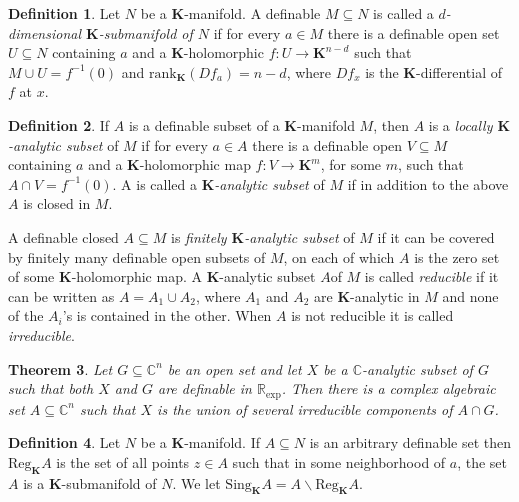 \documentclass{amsart}
\newtheorem{theorem}{Theorem}[subsection]
\theoremstyle{definition}
\newtheorem{definition}[theorem]{Definition}
\numberwithin{equation}{section}
\begin{document}
\begin{definition}
	Let $N$ be a $\mathbf{K}$-manifold.
	A definable $M \subseteq N$ is called a \emph{$d$-dimensional $\mathbf{K}$-submanifold of $N$} if for every $a\in M$ there is a definable open set $U \subseteq N$ containing $a$ and a $\mathbf{K}$-holomorphic $f: U \to \mathbf{K}^{n-d}$ such that $M \cup U = f^{-1}(0)$ and $\mathrm{rank}_{\mathbf{K}}(Df_a) = n-d$,
	where $Df_x$ is the $\mathbf{K}$-differential of $f$ at $x$.
\end{definition}

\begin{definition}
	If $A$ is a definable subset of a $\mathbf{K}$-manifold $M$,
	then $A$ is a \emph{locally $\mathbf{K}$-analytic subset} of $M$
	if for every $a\in A$ there is a definable open $V \subseteq M$ containing $a$ and a $\mathbf{K}$-holomorphic map $f : V \to \mathbf{K}^m$,
	for some $m$, such that $A\cap V= f^{-1}(0)$.
	A is called a \emph{$\mathbf{K}$-analytic subset} of $M$ if in addition to the above $A$ is closed in $M$.

	A definable closed $A \subseteq M$ is \emph{finitely $\mathbf{K}$-analytic subset} of $M$ if it can be covered by finitely many definable open subsets of $M$,
	on each of which $A$ is the zero set of some $\mathbf{K}$-holomorphic map.
	A $\mathbf{K}$-analytic subset $A $of $M$ is called \emph{reducible} if it can be written as $A= A_1 \cup A_2$,
	where $A_1$ and $A_2$ are $\mathbf{K}$-analytic in $M$ and none of the $A_i$'s is contained in the other.
	When $A$ is not reducible it is called \emph{irreducible}.
\end{definition}

\begin{theorem}
	Let $G \subseteq \mathbb{C}^n$ be an open set and let $X$ be a $\mathbb{C}$-analytic subset of $G$ such that both $X$ and $G$ are definable in $\mathbb{R}_{\exp}$.
	Then there is a complex algebraic set $A \subseteq \mathbb{C}^n$ such that $X$ is the union of several irreducible components of $A\cap G$.
\end{theorem}

\begin{definition}
	Let $N$ be a $\mathbf{K}$-manifold.
	If $A \subseteq N$ is an arbitrary definable set then $\mathrm{Reg}_{\mathbf{K}}A$ is the set of all points $z \in A$ such that in some neighborhood of $a$,
	the set $A$ is a $\mathbf{K}$-submanifold of $N$.
	We let $\mathrm{Sing}_{\mathbf{K}}A = A \backslash \mathrm{Reg}_{\mathbf{K}}A$.
\end{definition}
\end{document}
